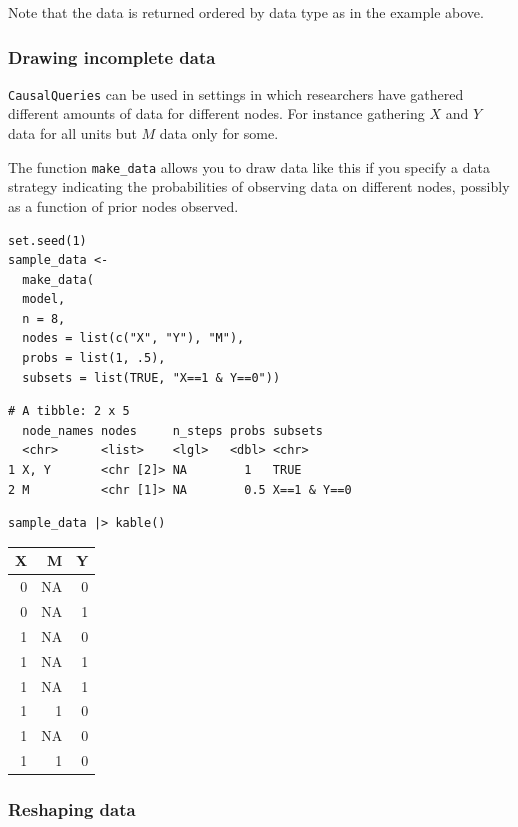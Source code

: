 \documentclass[
  article]{jss}
\begin{document}
Note that the data is returned ordered by data type as in the example
above.

\hypertarget{drawing-incomplete-data}{%
\subsubsection{Drawing incomplete data}\label{drawing-incomplete-data}}

\texttt{CausalQueries} can be used in settings in which researchers have
gathered different amounts of data for different nodes. For instance
gathering \(X\) and \(Y\) data for all units but \(M\) data only for
some.

The function \texttt{make\_data} allows you to draw data like this if
you specify a data strategy indicating the probabilities of observing
data on different nodes, possibly as a function of prior nodes observed.

\begin{verbatim}
set.seed(1)
sample_data <-
  make_data(
  model,
  n = 8,
  nodes = list(c("X", "Y"), "M"),
  probs = list(1, .5),
  subsets = list(TRUE, "X==1 & Y==0"))
\end{verbatim}

\begin{verbatim}
# A tibble: 2 x 5
  node_names nodes     n_steps probs subsets    
  <chr>      <list>    <lgl>   <dbl> <chr>      
1 X, Y       <chr [2]> NA        1   TRUE       
2 M          <chr [1]> NA        0.5 X==1 & Y==0
\end{verbatim}

\begin{verbatim}
sample_data |> kable()
\end{verbatim}

\begin{longtable}[]{@{}rrr@{}}
\toprule()
X & M & Y \\
\midrule()
\endhead
0 & NA & 0 \\
0 & NA & 1 \\
1 & NA & 0 \\
1 & NA & 1 \\
1 & NA & 1 \\
1 & 1 & 0 \\
1 & NA & 0 \\
1 & 1 & 0 \\
\bottomrule()
\end{longtable}

\hypertarget{reshaping-data}{%
\subsubsection{Reshaping data}\label{reshaping-data}}
\end{document}
